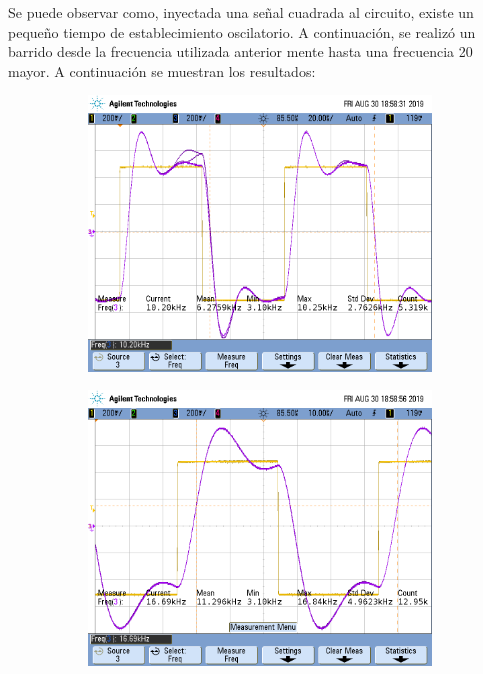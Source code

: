 Se puede observar como, inyectada una señal cuadrada al circuito, existe un pequeño tiempo de establecimiento oscilatorio. A continuación, se realizó un barrido desde la frecuencia utilizada anterior mente hasta una frecuencia 20 mayor. A continuación se muestran los resultados:

\begin{figure}[H]
\begin{subfigure}
  \centering
  \includegraphics[width=.8\textwidth]{Ejercicio2/Mediciones/A/waveform2.png}  
\end{subfigure}
\begin{subfigure}
  \centering
  \includegraphics[width=.8\textwidth]{Ejercicio2/Mediciones/A/waveform3.png}  
\end{subfigure}
\begin{subfigure}
  \centering

\end{subfigure}
\end{figure}

